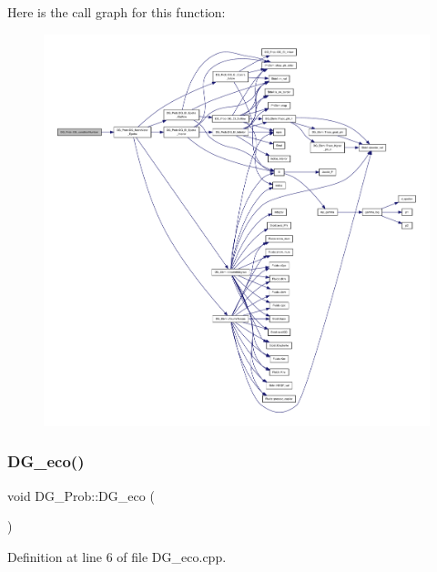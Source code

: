 Here is the call graph for this function\+:
\nopagebreak
\begin{figure}[H]
\begin{center}
\leavevmode
\includegraphics[width=350pt]{classDG__Prob_acb4b2ec3201e22d62bcf50b947b10dc5_cgraph}
\end{center}
\end{figure}
\mbox{\label{classDG__Prob_a88ea70f33384c520034fab83e7db8e7e}} 
\subsubsection{\texorpdfstring{D\+G\+\_\+eco()}{DG\_eco()}}
{\footnotesize\ttfamily void D\+G\+\_\+\+Prob\+::\+D\+G\+\_\+eco (\begin{DoxyParamCaption}{ }\end{DoxyParamCaption})}



Definition at line 6 of file D\+G\+\_\+eco.\+cpp.



